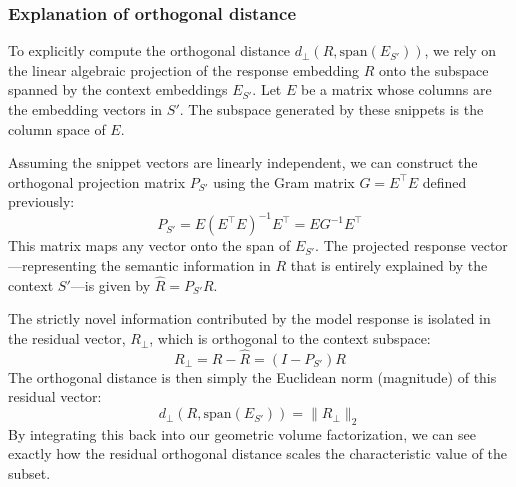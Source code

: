 \documentclass{article}
\begin{document}
\subsubsection{Explanation of orthogonal distance}
To explicitly compute the orthogonal distance $d_{\perp}(R, \text{span}(E_{S'}))$, we rely on the linear algebraic projection of the response embedding $R$ onto the subspace spanned by the context embeddings $E_{S'}$. Let $E$ be a matrix whose columns are the embedding vectors in $S'$. The subspace generated by these snippets is the column space of $E$. 

Assuming the snippet vectors are linearly independent, we can construct the orthogonal projection matrix $P_{S'}$ using the Gram matrix $G = E^\top E$ defined previously:
$$ P_{S'} = E (E^\top E)^{-1} E^\top = E G^{-1} E^\top $$
This matrix maps any vector onto the span of $E_{S'}$. The projected response vector—representing the semantic information in $R$ that is entirely explained by the context $S'$—is given by $\hat{R} = P_{S'} R$. 

The strictly novel information contributed by the model response is isolated in the residual vector, $R_{\perp}$, which is orthogonal to the context subspace:
$$ R_{\perp} = R - \hat{R} = (I - P_{S'}) R $$
The orthogonal distance is then simply the Euclidean norm (magnitude) of this residual vector:
$$ d_{\perp}(R, \text{span}(E_{S'})) = \| R_{\perp} \|_2 $$
By integrating this back into our geometric volume factorization, we can see exactly how the residual orthogonal distance scales the characteristic value of the subset.
\end{document}
